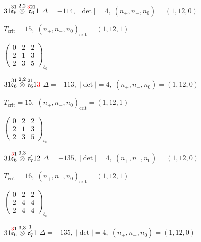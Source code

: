 \documentclass[10pt]{article}
\begin{document}
$31\overset{31}{\mathfrak{e}_6}\overset{2,2}{\otimes}\overset{\textcolor{red}{3}21}{\mathfrak{e}_6}1$ \quad $\Delta=-114,\; |\det|=4,\; (n_+,n_-,n_0)=(1,12,0)$

\hspace{1em}$T_{\text{crit}}=15,\; (n_+,n_-,n_0)_{\text{crit}}=(1,12,1)$

\hspace{2em}$\left(\begin{smallmatrix}0 & 2 & 2 \\ 2 & 1 & 3 \\ 2 & 3 & 5\end{smallmatrix}\right)_{\!b_0}$

$31\overset{31}{\mathfrak{e}_6}\overset{2,2}{\otimes}\overset{21}{\mathfrak{e}_6}1\textcolor{red}{3}$ \quad $\Delta=-113,\; |\det|=4,\; (n_+,n_-,n_0)=(1,12,0)$

\hspace{1em}$T_{\text{crit}}=15,\; (n_+,n_-,n_0)_{\text{crit}}=(1,12,1)$

\hspace{2em}$\left(\begin{smallmatrix}0 & 2 & 2 \\ 2 & 1 & 3 \\ 2 & 3 & 5\end{smallmatrix}\right)_{\!b_0}$

\smallskip

$31\overset{\textcolor{red}{3}1}{\mathfrak{e}_6}\overset{3,3}{\otimes}\mathfrak{e}_7'12$ \quad $\Delta=-135,\; |\det|=4,\; (n_+,n_-,n_0)=(1,12,0)$

\hspace{1em}$T_{\text{crit}}=16,\; (n_+,n_-,n_0)_{\text{crit}}=(1,12,1)$

\hspace{2em}$\left(\begin{smallmatrix}0 & 2 & 2 \\ 2 & 4 & 4 \\ 2 & 4 & 4\end{smallmatrix}\right)_{\!b_0}$

\smallskip

$31\overset{\textcolor{red}{3}1}{\mathfrak{e}_6}\overset{3,3}{\otimes}\overset{1}{\mathfrak{e}_7'}1$ \quad $\Delta=-135,\; |\det|=4,\; (n_+,n_-,n_0)=(1,12,0)$
\end{document}
